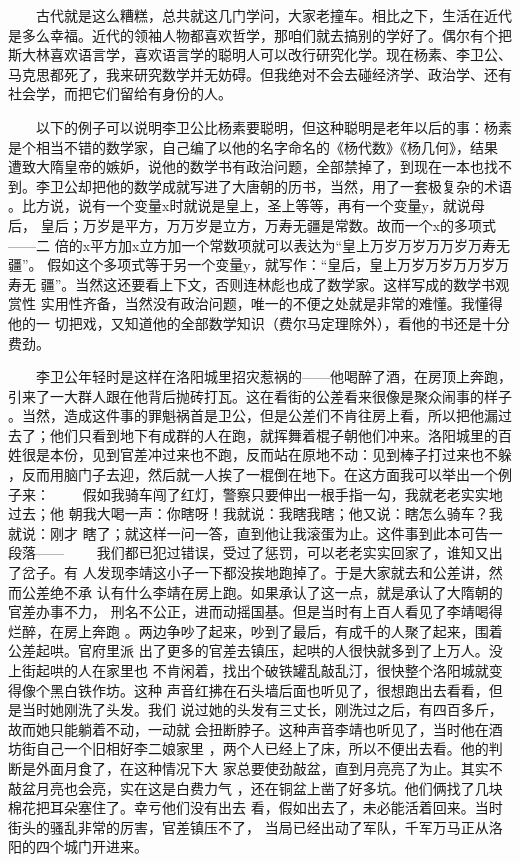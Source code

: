 　　古代就是这么糟糕，总共就这几门学问，大家老撞车。相比之下，生活在近代 是多么幸福。近代的领袖人物都喜欢哲学，那咱们就去搞别的学好了。偶尔有个把 斯大林喜欢语言学，喜欢语言学的聪明人可以改行研究化学。现在杨素、李卫公、 马克思都死了，我来研究数学并无妨碍。但我绝对不会去碰经济学、政治学、还有 社会学，而把它们留给有身份的人。

 　　以下的例子可以说明李卫公比杨素要聪明，但这种聪明是老年以后的事：杨素 是个相当不错的数学家，自己编了以他的名字命名的《杨代数》《杨几何》，结果 遭致大隋皇帝的嫉妒，说他的数学书有政治问题，全部禁掉了，到现在一本也找不 到。李卫公却把他的数学成就写进了大唐朝的历书，当然，用了一套极复杂的术语 。比方说，说有一个变量x时就说是皇上，圣上等等，再有一个变量y，就说母后， 皇后；万岁是平方，万万岁是立方，万寿无疆是常数。故而一个x的多项式——二 倍的x平方加x立方加一个常数项就可以表达为“皇上万岁万岁万万岁万寿无疆”。 假如这个多项式等于另一个变量y，就写作：“皇后，皇上万岁万岁万万岁万寿无 疆”。当然这还要看上下文，否则连林彪也成了数学家。这样写成的数学书观赏性 实用性齐备，当然没有政治问题，唯一的不便之处就是非常的难懂。我懂得他的一 切把戏，又知道他的全部数学知识（费尔马定理除外），看他的书还是十分费劲。 
 
 　　李卫公年轻时是这样在洛阳城里招灾惹祸的——他喝醉了酒，在房顶上奔跑， 引来了一大群人跟在他背后抛砖打瓦。这在看街的公差看来很像是聚众闹事的样子 。当然，造成这件事的罪魁祸首是卫公，但是公差们不肯往房上看，所以把他漏过 去了；他们只看到地下有成群的人在跑，就挥舞着棍子朝他们冲来。洛阳城里的百 姓很是本份，见到官差冲过来也不跑，反而站在原地不动：见到棒子打过来也不躲 ，反而用脑门子去迎，然后就一人挨了一棍倒在地下。在这方面我可以举出一个例 子来： 　　假如我骑车闯了红灯，警察只要伸出一根手指一勾，我就老老实实地过去；他 朝我大喝一声：你瞎呀！我就说：我瞎我瞎；他又说：瞎怎么骑车？我就说：刚才 瞎了；就这样一问一答，直到他让我滚蛋为止。这件事到此本可告一段落—— 　　我们都已犯过错误，受过了惩罚，可以老老实实回家了，谁知又出了岔子。有 人发现李靖这小子一下都没挨地跑掉了。于是大家就去和公差讲，然而公差绝不承 认有什么李靖在房上跑。如果承认了这一点，就是承认了大隋朝的官差办事不力， 刑名不公正，进而动摇国基。但是当时有上百人看见了李靖喝得烂醉，在房上奔跑 。两边争吵了起来，吵到了最后，有成千的人聚了起来，围着公差起哄。官府里派 出了更多的官差去镇压，起哄的人很快就多到了上万人。没上街起哄的人在家里也 不肯闲着，找出个破铁罐乱敲乱汀，很快整个洛阳城就变得像个黑白铁作坊。这种 声音红拂在石头墙后面也听见了，很想跑出去看看，但是当时她刚洗了头发。我们 说过她的头发有三丈长，刚洗过之后，有四百多斤，故而她只能躺着不动，一动就 会扭断脖子。这种声音李靖也听见了，当时他在酒坊街自己一个旧相好李二娘家里 ，两个人已经上了床，所以不便出去看。他的判断是外面月食了，在这种情况下大 家总要使劲敲盆，直到月亮亮了为止。其实不敲盆月亮也会亮，实在这是白费力气 ，还在铜盆上凿了好多坑。他们俩找了几块棉花把耳朵塞住了。幸亏他们没有出去 看，假如出去了，未必能活着回来。当时街头的骚乱非常的厉害，官差镇压不了， 当局已经出动了军队，千军万马正从洛阳的四个城门开进来。 
 
